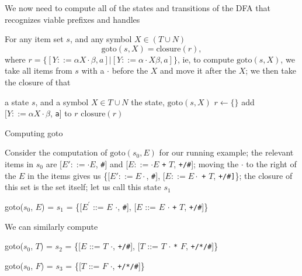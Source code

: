 \documentclass[8pt,a4paper,compress,handout]{beamer}
\newcommand{\mm}[1]{$#1$}
\newcommand{\expo}[2]{$#1^{#2}$}
\newcommand{\subs}[2]{${#1}_{#2}$}
\newenvironment{spaced}
{
\smallskip
\hspace{.5cm}
\begin{minipage}[c]{\textwidth}
}
{
\end{minipage}
\smallskip
}
\begin{document}
\begin{frame}[fragile]
\pause

We now need to compute all of the states and transitions of the DFA that recognizes viable prefixes and handles

\pause
\bigskip

For any item set $s$, and any symbol $X \in (T \cup N)$ $$\text{goto}(s, X) = \text{closure}(r),$$ where $r = \{[Y ::= \alpha X \cdot \beta, a] | [Y ::= \alpha \cdot X \beta, a]\}$, ie, to compute $\text{goto}(s,X)$, we take all items from $s$ with a $\cdot$ before the $X$ and move it after the $X$; we then take the closure of that

\pause
\bigskip

\begin{algorithm}[H]
\begin{algorithmic}
\REQUIRE a state $s$, and a symbol $X \in T \cup N$
\ENSURE the state, $\text{goto}(s, X)$
\STATE $r \gets \{\}$
\STATE add $[Y ::= \alpha X \cdot \beta$, \lstinline{a}] to $r$
\ENDFOR
\RETURN $\text{closure}(r)$
\end{algorithmic}
\caption{Computing goto}
\end{algorithm}
\end{frame}

\begin{frame}[fragile]
\pause

Consider the computation of $\text{goto}(s_0, E)$ for our running example; the relevant items in $s_0$ are [$E' ::= \cdot E$, \lstinline{#}] and [$E  ::= \cdot E$ \lstinline{+} $T$, \lstinline{+/#}]; moving the $\cdot$ to the right of the $E$ in the items gives us \{[$E' ::= E \cdot$, \lstinline{#}], [$E  ::= E  \cdot$ \lstinline{+} $T$, \lstinline{+/#]}\}; the closure of this set is the set itself; let us call this state $s_1$

\text{ }
\begin{spaced}
\begin{production}
goto(\subs{s}{0}, \mm{E}) = \subs{s}{1}
                = \{[\expo{E}{\prime} ::= \mm{E} \mm{\cdot}, \lstinline{#}],
                    [\mm{E}  ::= \mm{E} \mm{\cdot} \lstinline{+} \mm{T}, \lstinline{+/#}]\}
\end{production}
\end{spaced}

\pause

We can similarly compute

\text{ }
\begin{spaced}
\begin{production}
goto(\subs{s}{0}, \mm{T}) = \subs{s}{2}
                = \{[\mm{E}  ::= \mm{T} \mm{\cdot}, \lstinline{+/#}],
                    [\mm{T}  ::= \mm{T} \mm{\cdot} \lstinline{*} \mm{F}, \lstinline{+/*/#}]\}

goto(\subs{s}{0}, \mm{F}) = \subs{s}{3}
                = \{[\mm{T}  ::= \mm{F} \mm{\cdot}, \lstinline{+/*/#}]\}
\end{production}
\end{spaced}
\end{frame}
\end{document}
